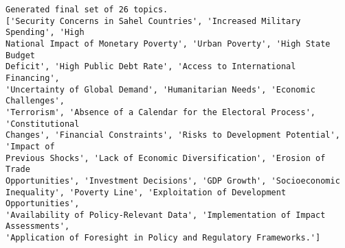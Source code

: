 \documentclass[11pt]{article}
\begin{document}
    \begin{Verbatim}[commandchars=\\\{\}]
Generated final set of 26 topics.
['Security Concerns in Sahel Countries', 'Increased Military Spending', 'High
National Impact of Monetary Poverty', 'Urban Poverty', 'High State Budget
Deficit', 'High Public Debt Rate', 'Access to International Financing',
'Uncertainty of Global Demand', 'Humanitarian Needs', 'Economic Challenges',
'Terrorism', 'Absence of a Calendar for the Electoral Process', 'Constitutional
Changes', 'Financial Constraints', 'Risks to Development Potential', 'Impact of
Previous Shocks', 'Lack of Economic Diversification', 'Erosion of Trade
Opportunities', 'Investment Decisions', 'GDP Growth', 'Socioeconomic
Inequality', 'Poverty Line', 'Exploitation of Development Opportunities',
'Availability of Policy-Relevant Data', 'Implementation of Impact Assessments',
'Application of Foresight in Policy and Regulatory Frameworks.']
    \end{Verbatim}
\end{document}
